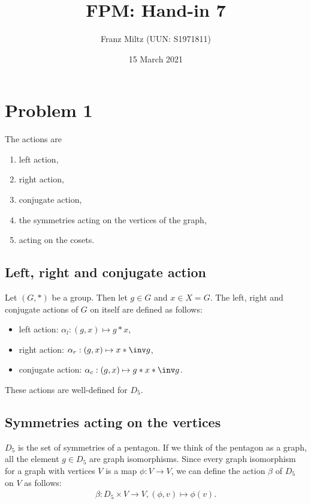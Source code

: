 \documentclass{article}
\begin{document}
\title{FPM: Hand-in 7}
\author{Franz Miltz (UUN: S1971811)}
\date{15 March 2021}
\maketitle
\mkthms
\section*{Problem 1}

The actions are
\begin{enumerate}
    \item left action,
    \item right action,
    \item conjugate action,
    \item the symmetries acting on the vertices of the graph,
    \item acting on the cosets.
\end{enumerate}

\subsection*{Left, right and conjugate action}

Let $(G, *)$ be a group. Then let $g\in G$ and $x\in X = G$.
The left, right and conjugate actions of $G$ on itself are defined as follows:

\begin{itemize}
    \item left action: $\alpha_l: (g,x) \mapsto g * x$,
    \item right action: $\alpha_r: (g,x) \mapsto x * \inv g$,
    \item conjugate action: $\alpha_c: (g,x) \mapsto g * x * \inv g$.
\end{itemize}

\noindent These actions are well-defined for $D_5$.

\subsection*{Symmetries acting on the vertices}

$D_5$ is the set of symmetries of a pentagon. If we think of the pentagon as
a graph, all the element $g\in D_5$ are graph isomorphisms. Since every
graph isomorphism for a graph with vertices $V$ is a map $\phi:V\to V$,
we can define the action $\beta$ of $D_5$ on $V$ as follows:
\begin{align*}
    \beta: D_5\times V\to V,(\phi, v)\mapsto \phi(v).
\end{align*}
\end{document}
